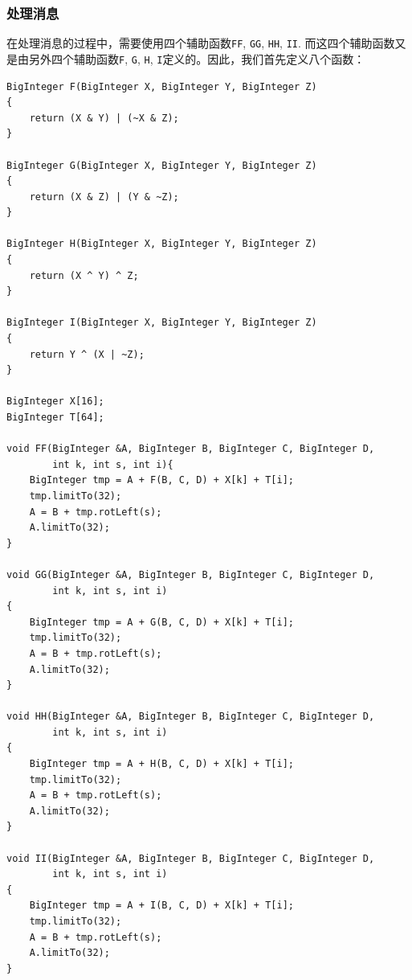 \subsubsection{处理消息}
在处理消息的过程中，需要使用四个辅助函数\verb`FF`, \verb`GG`, \verb`HH`, \verb`II`. 而这四个辅助函数又是由另外四个辅助函数\verb`F`, \verb`G`, \verb`H`, \verb`I`定义的。因此，我们首先定义八个函数：
\begin{prove}
\begin{verbatim}
BigInteger F(BigInteger X, BigInteger Y, BigInteger Z)
{
    return (X & Y) | (~X & Z);
}

BigInteger G(BigInteger X, BigInteger Y, BigInteger Z)
{
    return (X & Z) | (Y & ~Z);
}

BigInteger H(BigInteger X, BigInteger Y, BigInteger Z)
{
    return (X ^ Y) ^ Z;
}

BigInteger I(BigInteger X, BigInteger Y, BigInteger Z)
{
    return Y ^ (X | ~Z);
}

BigInteger X[16];
BigInteger T[64];

void FF(BigInteger &A, BigInteger B, BigInteger C, BigInteger D, 
        int k, int s, int i){
    BigInteger tmp = A + F(B, C, D) + X[k] + T[i];
    tmp.limitTo(32);
    A = B + tmp.rotLeft(s);
    A.limitTo(32);
}

void GG(BigInteger &A, BigInteger B, BigInteger C, BigInteger D, 
        int k, int s, int i)
{
    BigInteger tmp = A + G(B, C, D) + X[k] + T[i];
    tmp.limitTo(32);
    A = B + tmp.rotLeft(s);
    A.limitTo(32);
}

void HH(BigInteger &A, BigInteger B, BigInteger C, BigInteger D, 
        int k, int s, int i)
{
    BigInteger tmp = A + H(B, C, D) + X[k] + T[i];
    tmp.limitTo(32);
    A = B + tmp.rotLeft(s);
    A.limitTo(32);
}

void II(BigInteger &A, BigInteger B, BigInteger C, BigInteger D, 
        int k, int s, int i)
{
    BigInteger tmp = A + I(B, C, D) + X[k] + T[i];
    tmp.limitTo(32);
    A = B + tmp.rotLeft(s);
    A.limitTo(32);
}
\end{verbatim}
\end{prove}

